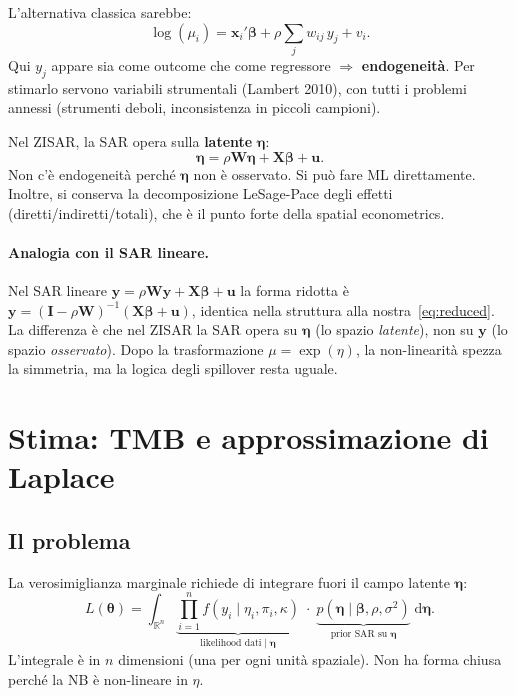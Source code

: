 \documentclass[12pt,a4paper]{article}
\newcommand{\bW}{\mathbf{W}}
\newcommand{\bX}{\mathbf{X}}
\newcommand{\by}{\mathbf{y}}
\newcommand{\bu}{\mathbf{u}}
\newcommand{\bI}{\mathbf{I}}
\begin{document}
L'alternativa classica sarebbe:
\[
  \log(\mu_i) = \mathbf{x}_i'\boldsymbol{\beta} + \rho \sum_j w_{ij}\,y_j + v_i.
\]
Qui $y_j$ appare sia come outcome che come regressore $\Rightarrow$ \textbf{endogeneit\`a}. Per stimarlo servono variabili strumentali (Lambert 2010), con tutti i problemi annessi (strumenti deboli, inconsistenza in piccoli campioni).

Nel ZISAR, la SAR opera sulla \textbf{latente} $\boldsymbol{\eta}$:
\[
  \boldsymbol{\eta} = \rho\bW\boldsymbol{\eta} + \bX\boldsymbol{\beta} + \bu.
\]
Non c'\`e endogeneit\`a perch\'e $\boldsymbol{\eta}$ non \`e osservato. Si pu\`o fare ML direttamente. Inoltre, si conserva la decomposizione LeSage-Pace degli effetti (diretti/indiretti/totali), che \`e il punto forte della spatial econometrics.

\paragraph{Analogia con il SAR lineare.}
Nel SAR lineare $\by = \rho\bW\by + \bX\boldsymbol{\beta} + \bu$ la forma ridotta \`e $\by = (\bI - \rho\bW)^{-1}(\bX\boldsymbol{\beta} + \bu)$, identica nella struttura alla nostra~\eqref{eq:reduced}. La differenza \`e che nel ZISAR la SAR opera su $\boldsymbol{\eta}$ (lo spazio \emph{latente}), non su $\by$ (lo spazio \emph{osservato}). Dopo la trasformazione $\mu = \exp(\eta)$, la non-linearit\`a spezza la simmetria, ma la logica degli spillover resta uguale.

\section{Stima: TMB e approssimazione di Laplace}

\subsection{Il problema}

La verosimiglianza marginale richiede di integrare fuori il campo latente $\boldsymbol{\eta}$:
\[
  L(\boldsymbol{\theta}) = \int_{\mathbb{R}^n}
  \underbrace{\prod_{i=1}^{n} f(y_i \mid \eta_i, \pi_i, \kappa)}_{\text{likelihood dati} \mid \boldsymbol{\eta}}
  \;\cdot\;
  \underbrace{p(\boldsymbol{\eta} \mid \boldsymbol{\beta}, \rho, \sigma^2)}_{\text{prior SAR su } \boldsymbol{\eta}}
  \;\mathrm{d}\boldsymbol{\eta}.
\]
L'integrale \`e in $n$ dimensioni (una per ogni unit\`a spaziale). Non ha forma chiusa perch\'e la NB \`e non-lineare in $\eta$.
\end{document}
